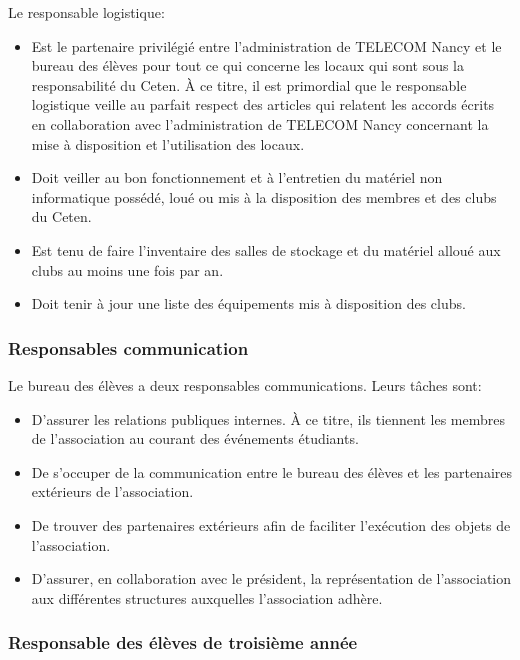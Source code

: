 \documentclass{article} %
\begin{document}
				Le responsable logistique:
				\begin{itemize}
					\item Est le partenaire privilégié entre l’administration de
						TELECOM Nancy et le bureau des élèves pour tout ce qui
						concerne les locaux qui sont sous la responsabilité du
						Ceten. À ce titre, il est primordial que le responsable
						logistique veille au parfait respect des articles qui
						relatent les accords écrits en collaboration avec
						l’administration de TELECOM Nancy concernant la mise à
						disposition et l’utilisation des locaux.
					\item Doit veiller au bon fonctionnement et à l’entretien du
						matériel non informatique possédé, loué ou mis à la
						disposition des membres et des clubs du Ceten.
					\item Est tenu de faire l’inventaire des salles de stockage
						et du matériel alloué aux clubs au moins une fois par
						an.
					\item Doit tenir à jour une liste des équipements mis à
						disposition des clubs.
				\end{itemize}

			\subsubsection{Responsables communication}
\label{ssub:responsables_communication}

				Le bureau des élèves a deux responsables communications. Leurs
				tâches sont:
				\begin{itemize}
					\item D’assurer les relations publiques internes. À ce
						titre, ils tiennent les membres de l’association au
						courant des événements étudiants.
					\item De s’occuper de la communication entre le bureau des
						élèves et les partenaires extérieurs de l’association.
					\item De trouver des partenaires extérieurs afin de
						faciliter l’exécution des objets de l’association.
					\item D’assurer, en collaboration avec le président, la
						représentation de l’association aux différentes
						structures auxquelles l’association adhère. 
				\end{itemize}

			\subsubsection{Responsable des élèves de troisième année}
\label{ssub:responsable_des_eleves_de_troisieme_annee}
\end{document}
